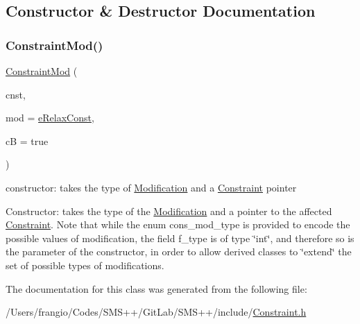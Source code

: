 \subsection{Constructor \& Destructor Documentation}
\mbox{\label{class_s_m_spp__di__unipi__it_1_1_constraint_mod_a7a4f04b77f47c74540c0edb1dc7e24d7}} 
\subsubsection{\texorpdfstring{Constraint\+Mod()}{ConstraintMod()}}
{\footnotesize\ttfamily \mbox{\hyperlink{class_s_m_spp__di__unipi__it_1_1_constraint_mod}{Constraint\+Mod}} (\begin{DoxyParamCaption}\item[{\mbox{\hyperlink{class_s_m_spp__di__unipi__it_1_1_constraint}{Constraint}} $\ast$}]{cnst,  }\item[{int}]{mod = {\ttfamily \mbox{\hyperlink{class_s_m_spp__di__unipi__it_1_1_constraint_mod_a083683af0e6943bd7a3261e9037fd149ae7de2a648a32c2f1e3b1b789af090854}{e\+Relax\+Const}}},  }\item[{const bool}]{cB = {\ttfamily true} }\end{DoxyParamCaption})\hspace{0.3cm}{\ttfamily [inline]}}



constructor\+: takes the type of \mbox{\hyperlink{class_s_m_spp__di__unipi__it_1_1_modification}{Modification}} and a \mbox{\hyperlink{class_s_m_spp__di__unipi__it_1_1_constraint}{Constraint}} pointer 

Constructor\+: takes the type of the \mbox{\hyperlink{class_s_m_spp__di__unipi__it_1_1_modification}{Modification}} and a pointer to the affected \mbox{\hyperlink{class_s_m_spp__di__unipi__it_1_1_constraint}{Constraint}}. Note that while the enum cons\+\_\+mod\+\_\+type is provided to encode the possible values of modification, the field f\+\_\+type is of type \char`\"{}int\char`\"{}, and therefore so is the parameter of the constructor, in order to allow derived classes to \char`\"{}extend\char`\"{} the set of possible types of modifications. 

The documentation for this class was generated from the following file\+:\begin{DoxyCompactItemize}
\item 
/\+Users/frangio/\+Codes/\+S\+M\+S++/\+Git\+Lab/\+S\+M\+S++/include/\mbox{\hyperlink{_constraint_8h}{Constraint.\+h}}\end{DoxyCompactItemize}
